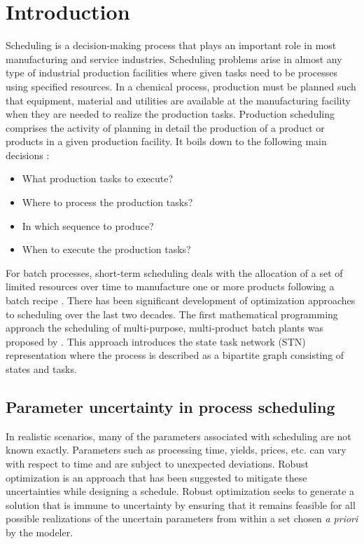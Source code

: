 \chapter{Introduction}
\thispagestyle{plain}

Scheduling is a decision-making process that plays an important role in most manufacturing and service industries. %
Scheduling problems arise in almost any type of industrial production facilities where given tasks need to be processes using specified resources. In a chemical process, production must be planned such that equipment, material and utilities are available at the manufacturing facility when they are needed to realize the production tasks. Production scheduling comprises the activity of planning in detail the production of a product or products in a given production facility. It boils down to the following main decisions \citep{HARJUNKOSKI2014161}:
\begin{itemize}
\item What production tasks to execute?
\item Where to process the production tasks?
\item In which sequence to produce?
\item When to execute the production tasks?
\end{itemize}

For batch processes, short-term scheduling deals with the allocation of a set of limited resources over time to manufacture one or more products following a batch recipe \citep{MENDEZ}. There has been significant development of optimization approaches to scheduling over the last two decades. The first mathematical programming approach the scheduling of multi-purpose, multi-product batch plants was proposed by \cite{KONDILI1993211}. This approach introduces the state task network (STN) representation where the process is described as a bipartite graph consisting of states and tasks.

\section{Parameter uncertainty in process scheduling}

In realistic scenarios, many of the parameters associated with scheduling are not known exactly. Parameters such as processing time, yields, prices, etc. can vary with respect to time and are subject to unexpected deviations. Robust optimization is an approach that has been suggested to mitigate these uncertainties while designing a schedule. Robust optimization seeks to generate a solution that is immune to uncertainty by ensuring that it remains feasible for all possible realizations of the uncertain parameters from within a set chosen \emph{a priori} by the modeler.

